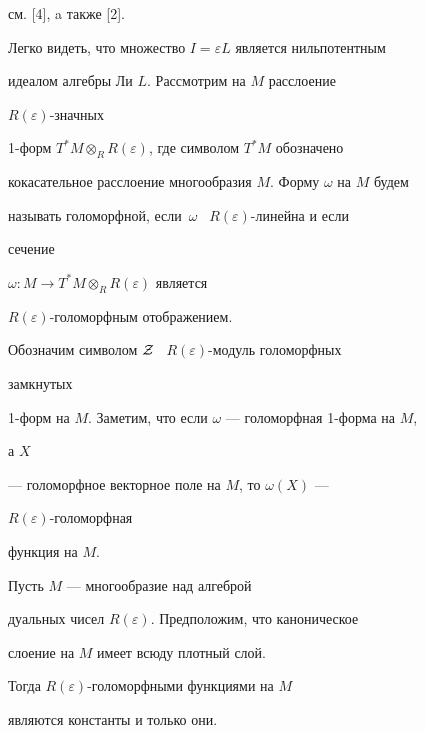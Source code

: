 см. [4], a также [2]. 


 


Легко видеть, что множество $I=\varepsilon L$ является нильпотентным 


идеалом алгебры Ли $L$. Рассмотрим на $M$ расслоение 


$R(\varepsilon)$-значных 


1-форм $T^*M\otimes_R R(\varepsilon)$, где символом $T^*M$ обозначено 


кокасательное расслоение многообразия $M$. Форму $\omega$ на $M$ будем 


называть голоморфной, если~$\omega$ \ $R(\varepsilon)$-линейна и если 


сечение 


$\omega:M\to T^*M\otimes_R R(\varepsilon)$ является 


$R(\varepsilon)$-голоморфным отображением. 


Обозначим символом $\cal Z$ \ $R(\varepsilon)$-модуль голоморфных 


замкнутых 


1-форм на $M$. Заметим, что если $\omega$ --- голоморфная 1-форма на $M$, 


а $X$ 


--- голоморфное векторное поле на $M$, то $\omega(X)$ --- 


$R(\varepsilon)$-голоморфная 


функция на $M$. 


 


\begin{lems} 


Пусть $M$ --- многообразие над алгеброй 


дуальных чисел $R(\varepsilon)$. Предположим, что каноническое


слоение на $M$ имеет всюду плотный слой. 


Тогда $R(\varepsilon)$-голоморфными функциями на $M$ 


являются константы и только они. 


\end{lems} 


 


